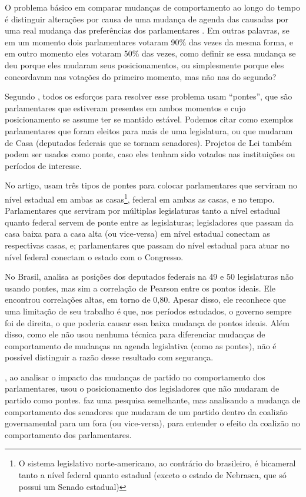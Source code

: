 O problema básico em comparar mudanças de comportamento ao longo do tempo é
distinguir alterações por causa de uma mudança de agenda das causadas por uma
real mudança das preferências dos parlamentares \cite{Bailey2007}. Em outras
palavras, se em um momento dois parlamentares votaram 90\% das vezes da mesma
forma, e em outro momento eles votaram 50\% das vezes, como definir se essa
mudança se deu porque eles mudaram seus posicionamentos, ou simplesmente porque
eles concordavam nas votações do primeiro momento, mas não nas do segundo?

Segundo , todos os esforços para resolver esse problema
usam ``pontes'', que são parlamentares que estiveram presentes em ambos
momentos e cujo posicionamento se assume ter se mantido estável. Podemos citar
como exemplos parlamentares que foram eleitos para mais de uma legislatura, ou
que mudaram de Casa (deputados federais que se tornam senadores). Projetos de
Lei também podem ser usados como ponte, caso eles tenham sido votados nas
instituições ou períodos de interesse.

No artigo,  usam três tipos de pontes para colocar
parlamentares que serviram no nível estadual em ambas as casas\footnote{O
sistema legislativo norte-americano, ao contrário do brasileiro, é bicameral
tanto a nível federal quanto estadual (exceto o estado de Nebrasca, que só
possui um Senado estadual)}, federal em ambas as casas, e no tempo.
Parlamentares que serviram por múltiplas legislaturas tanto a nível estadual
quanto federal servem de ponte entre as legislaturas; legisladores que passam
da casa baixa para a casa alta (ou vice-versa) em nível estadual conectam as
respectivas casas, e; parlamentares que passam do nível estadual para atuar no
nível federal conectam o estado com o Congresso.

No Brasil,  analisa as posições dos deputados federais na
49\textordfeminine{} e 50\textordfeminine{} legislaturas não usando pontes, mas
sim a correlação de Pearson entre os pontos ideais. Ele encontrou correlações
altas, em torno de 0,80. Apesar disso, ele reconhece que uma limitação de seu
trabalho é que, nos períodos estudados, o governo sempre foi de direita, o que
poderia causar essa baixa mudança de pontos ideais. Além disso, como ele não
usou nenhuma técnica para diferenciar mudanças de comportamento de mudanças na
agenda legislativa (como as pontes), não é possível distinguir a razão desse
resultado com segurança.

, ao analisar o impacto das mudanças de partido no
comportamento dos parlamentares, usou o posicionamento dos legisladores que não
mudaram de partido como pontes.  faz uma pesquisa
semelhante, mas analisando a mudança de comportamento dos senadores que mudaram
de um partido dentro da coalizão governamental para um fora (ou vice-versa),
para entender o efeito da coalizão no comportamento dos parlamentares.


